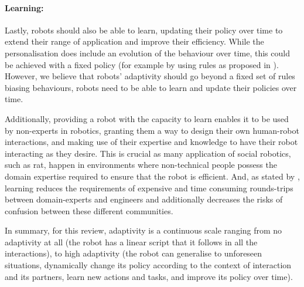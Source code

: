 \paragraph{Learning:} 
Lastly, robots should also be able to learn, updating their policy over time to extend their range of application and improve their efficiency.  While the personalisation does include an evolution of the behaviour over time, this could be achieved with a fixed policy (for example by using rules as proposed in \citealt{leyzberg2014personalizing}). However, we believe that robots' adaptivity should go beyond a fixed set of rules biasing behaviours, robots need to be able to learn and update their policies over time.

Additionally, providing a robot with the capacity to learn enables it to be used by non-experts in robotics, granting them a way to design their own human-robot interactions, and making use of their expertise and knowledge to have their robot interacting as they desire. This is crucial as many application of social robotics, such as \gls{rat}, happen in environments where non-technical people possess the domain expertise required to ensure that the robot is efficient. And, as stated by \cite{amershi2014power}, learning reduces the requirements of expensive and time consuming rounds-trips between domain-experts and engineers and additionally decreases the risks of confusion between these different communities. %

In summary, for this review, adaptivity is a continuous scale ranging from no adaptivity at all (the robot has a linear script that it follows in all the interactions), to high adaptivity (the robot can generalise to unforeseen situations, dynamically change its policy according to the context of interaction and its partners, learn new actions and tasks, and improve its policy over time). 

